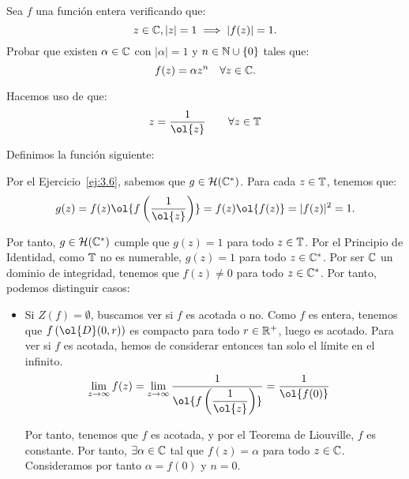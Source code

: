 \begin{ejercicio}
    Sea $f$ una función entera verificando que:
    \begin{equation*}
        z\in \mathbb{C}, |z|=1 \implies |f(z)|=1.
    \end{equation*}
    Probar que existen $\alpha\in \mathbb{C}$ con $|\alpha|=1$ y $n\in \mathbb{N}\cup\{0\}$ tales que:
    \begin{equation*}
        f(z)=\alpha z^n \quad \forall z\in \mathbb{C}.
    \end{equation*}

    Hacemos uso de que:
    \begin{equation*}
        z = \dfrac{1}{\ol{z}}\qquad \forall z\in \bb{T}
    \end{equation*}

    Definimos la función siguiente:

    Por el Ejercicio~\ref{ej:3.6}, sabemos que $g\in \mathcal{H}(\mathbb{C}^*)$. Para cada $z\in \mathbb{T}$, tenemos que:
    \begin{equation*}
        g(z) = f(z)\ol{f\left(\dfrac{1}{\ol{z}}\right)} = f(z)\ol{f(z)} = |f(z)|^2 = 1.
    \end{equation*}

    Por tanto, $g\in \mathcal{H}(\mathbb{C}^*)$ cumple que $g(z)=1$ para todo $z\in \mathbb{T}$. Por el Principio de Identidad, como $\mathbb{T}$ no es numerable, $g(z)=1$ para todo $z\in \mathbb{C}^*$. Por ser $\mathbb{C}$ un dominio de integridad, tenemos que $f(z)\neq 0$ para todo $z\in \mathbb{C}^*$. Por tanto, podemos distinguir casos:
    \begin{itemize}
        \item Si $Z(f)=\emptyset$, buscamos ver si $f$ es acotada o no. Como $f$ es entera, tenemos que $f\left(\ol{D}(0,r)\right)$ es compacto para todo $r\in \mathbb{R}^+$, luego es acotado. Para ver si $f$ es acotada, hemos de considerar entonces tan solo el límite en el infinito.
        \begin{align*}
            \lim_{z\to \infty} f(z) &= \lim_{z\to \infty} \dfrac{1}{\ol{f\left(\dfrac{1}{\ol{z}}\right)}} = \dfrac{1}{\ol{f(0)}}
        \end{align*}

        Por tanto, tenemos que $f$ es acotada, y por el Teorema de Liouville, $f$ es constante. Por tanto, $\exists \alpha\in \mathbb{C}$ tal que $f(z)=\alpha$ para todo $z\in \mathbb{C}$. Consideramos por tanto $\alpha=f(0)$ y $n=0$.
        

\end{itemize}
\end{ejercicio}
